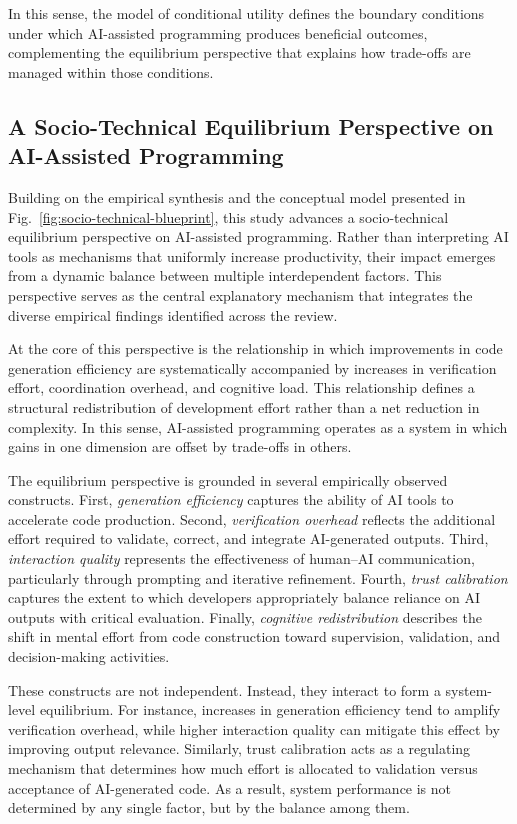 \documentclass[conference]{IEEEtran}
\begin{document}
In this sense, the model of conditional utility defines the boundary conditions under which AI-assisted programming produces beneficial outcomes, complementing the equilibrium perspective that explains how trade-offs are managed within those conditions.

\subsection{A Socio-Technical Equilibrium Perspective on AI-Assisted Programming}

Building on the empirical synthesis and the conceptual model presented in Fig.~\ref{fig:socio-technical-blueprint}, this study advances a socio-technical equilibrium perspective on AI-assisted programming. Rather than interpreting AI tools as mechanisms that uniformly increase productivity, their impact emerges from a dynamic balance between multiple interdependent factors. This perspective serves as the central explanatory mechanism that integrates the diverse empirical findings identified across the review.

At the core of this perspective is the relationship in which improvements in code generation efficiency are systematically accompanied by increases in verification effort, coordination overhead, and cognitive load. This relationship defines a structural redistribution of development effort rather than a net reduction in complexity. In this sense, AI-assisted programming operates as a system in which gains in one dimension are offset by trade-offs in others.

The equilibrium perspective is grounded in several empirically observed constructs. First, \textit{generation efficiency} captures the ability of AI tools to accelerate code production. Second, \textit{verification overhead} reflects the additional effort required to validate, correct, and integrate AI-generated outputs. Third, \textit{interaction quality} represents the effectiveness of human--AI communication, particularly through prompting and iterative refinement. Fourth, \textit{trust calibration} captures the extent to which developers appropriately balance reliance on AI outputs with critical evaluation. Finally, \textit{cognitive redistribution} describes the shift in mental effort from code construction toward supervision, validation, and decision-making activities.

These constructs are not independent. Instead, they interact to form a system-level equilibrium. For instance, increases in generation efficiency tend to amplify verification overhead, while higher interaction quality can mitigate this effect by improving output relevance. Similarly, trust calibration acts as a regulating mechanism that determines how much effort is allocated to validation versus acceptance of AI-generated code. As a result, system performance is not determined by any single factor, but by the balance among them.
\end{document}
